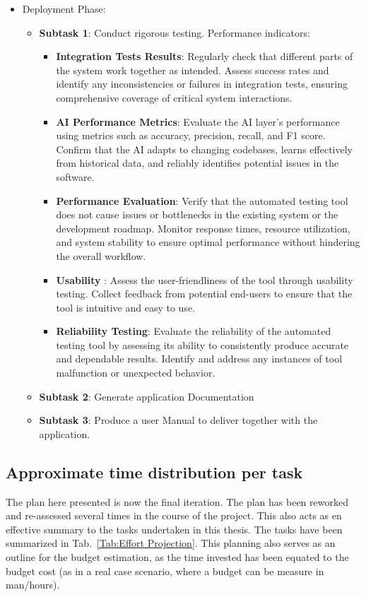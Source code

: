 \documentclass[a4paper, 11pt]{report}
\begin{document}
\begin{itemize}
\item  Deployment Phase:
\begin{itemize}
\item  \textbf{Subtask 1}: Conduct rigorous testing. Performance indicators:
    \begin{itemize}
        \item \textbf{Integration Tests Results}: Regularly check that different parts of the system work together as intended. Assess success rates and identify any inconsistencies or failures in integration tests, ensuring comprehensive coverage of critical system interactions.
        \item \textbf{AI Performance Metrics}: Evaluate the AI layer's performance using metrics such as accuracy, precision, recall, and F1 score. Confirm that the AI adapts to changing codebases, learns effectively from historical data, and reliably identifies potential issues in the software.
        \item \textbf{Performance Evaluation}: Verify that the automated testing tool does not cause issues or bottlenecks in the existing system or the development roadmap. Monitor response times, resource utilization, and system stability to ensure optimal performance without hindering the overall workflow.
        \item \textbf{Usability }: Assess the user-friendliness of the tool through usability testing. Collect feedback from potential end-users to ensure that the tool is intuitive and easy to use.
        \item \textbf{Reliability Testing}: Evaluate the reliability of the automated testing tool by assessing its ability to consistently produce accurate and dependable results. Identify and address any instances of tool malfunction or unexpected behavior.
    \end{itemize}
\item  \textbf{Subtask 2}: Generate application Documentation
\item  \textbf{Subtask 3}: Produce a user Manual to deliver together with the application.
\end{itemize}
\end{itemize}

\subsection{Approximate time distribution per task}
The plan here presented is now the final iteration. The plan has been reworked and re-assessed several times in the course of the project. This also acts as en effective summary to the tasks undertaken in this thesis.
The tasks have been summarized in Tab.~\ref{Tab:Effort Projection}. This planning also serves as an outline for the budget estimation, as the time invested has been equated to the budget cost (as in a real case scenario, where a budget can be measure in man/hours).
\end{document}
